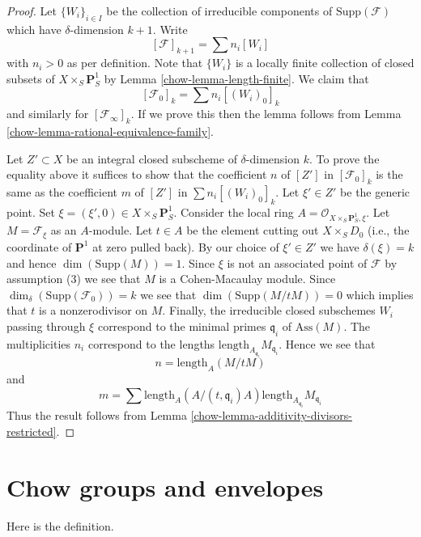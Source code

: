 \begin{proof}

Let $\{W_i\}_{i \in I}$ be the collection of irreducible
components of $\text{Supp}(\mathcal{F})$
which have $\delta$-dimension $k + 1$.
Write
$$
[\mathcal{F}]_{k + 1} = \sum n_i[W_i]
$$
with $n_i > 0$ as per definition. Note that $\{W_i\}$
is a locally finite collection of closed subsets of
$X \times_S \mathbf{P}^1_S$ by Lemma \ref{chow-lemma-length-finite}.
We claim that
$$
[\mathcal{F}_0]_k = \sum n_i[(W_i)_0]_k
$$
and similarly for $[\mathcal{F}_\infty]_k$. If we prove this then the lemma
follows from Lemma \ref{chow-lemma-rational-equivalence-family}.

\medskip\noindent
Let $Z' \subset X$ be an integral closed subscheme of $\delta$-dimension $k$.
To prove the equality above it suffices to show that the coefficient $n$
of $[Z']$ in $[\mathcal{F}_0]_k$ is the same as the coefficient $m$ of
$[Z']$ in $\sum n_i[(W_i)_0]_k$. Let $\xi' \in Z'$ be the generic point.
Set $\xi = (\xi', 0) \in  X \times_S \mathbf{P}^1_S$.
Consider the local ring $A = \mathcal{O}_{X \times_S \mathbf{P}^1_S, \xi}$.
Let $M = \mathcal{F}_\xi$ as an $A$-module.
Let $t \in A$ be the element cutting out $X \times_S D_0$
(i.e., the coordinate of $\mathbf{P}^1$ at zero pulled back).
By our choice of $\xi' \in Z'$ we have $\delta(\xi) = k$
and hence $\dim(\text{Supp}(M)) = 1$. Since $\xi$ is not an associated point
of $\mathcal{F}$ by assumption (3) we see that $M$ is a Cohen-Macaulay module.
Since $\dim_\delta(\text{Supp}(\mathcal{F}_0)) = k$
we see that $\dim(\text{Supp}(M/tM)) = 0$ which implies that $t$
is a nonzerodivisor on $M$. Finally, the irreducible closed subschemes
$W_i$ passing through $\xi$ correspond to the minimal primes
$\mathfrak q_i$ of $\text{Ass}(M)$. The multiplicities $n_i$ correspond
to the lengths $\text{length}_{A_{\mathfrak q_i}}M_{\mathfrak q_i}$.
Hence we see that
$$
n = \text{length}_A(M/tM)
$$
and
$$
m = \sum
\text{length}_A(A/(t, \mathfrak q_i)A)
\text{length}_{A_{\mathfrak q_i}}M_{\mathfrak q_i}
$$
Thus the result follows from
Lemma \ref{chow-lemma-additivity-divisors-restricted}.
\end{proof}

\section{Chow groups and envelopes}
\label{chow-section-envelopes}
Here is the definition.

